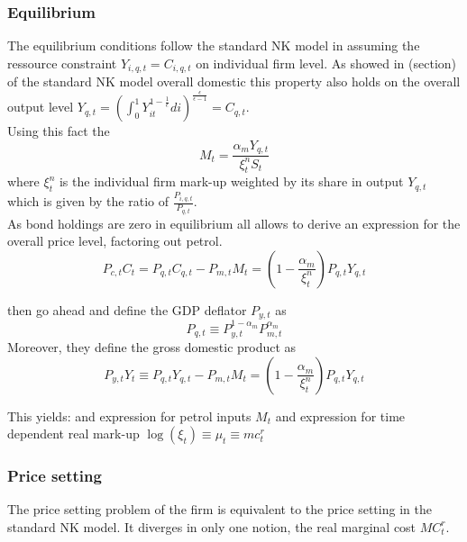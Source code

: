 \documentclass[12pt,a4paper,english]{article} %
\begin{document}
	\subsubsection{Equilibrium}
	The equilibrium conditions follow the standard NK model in assuming the ressource constraint $Y_{i,q,t} = C_{i,q,t}$ on individual firm level. As showed in (section) of the standard NK model overall domestic this property also holds on the overall output level $Y_{q,t} = \left( \int_{0}^{1} Y_{it}^{1-\frac{1}{\epsilon}} di \right)^{\frac{\epsilon}{\epsilon - 1}} = C_{q,t}$. \\
	
	Using this fact the 
	\begin{equation}
		M_t = \frac{\alpha_m Y_{q,t}}{\xi_{t}^n S_t}
	\end{equation}
	where $\xi_t^n$ is the individual firm mark-up weighted by its share in output $Y_{q,t}$ which is given by the ratio of $\frac{P_{i,q,t}}{P_{q,t}}$. \\
	
	As bond holdings are zero in equilibrium all  allows to derive an expression for the overall price level, factoring out petrol.
	\begin{equation}
		P_{c,t}C_t = P_{q,t} C_{q,t} - P_{m,t}M_t = \left(1 - \frac{\alpha_m}{\xi_t^n} \right) P_{q,t} Y_{q,t}
	\end{equation}

	\cite{blanchard_macroeconomic_2007} then go ahead and define the GDP deflator $P_{y,t}$ as
	\begin{equation}
		P_{q,t} \equiv P_{y,t}^{1-\alpha_m} P_{m,t}^{\alpha_m}
	\end{equation}
	Moreover, they define the gross domestic product as 
	\begin{equation}
		P_{y,t} Y_t \equiv P_{q,t} Y_{q,t} - P_{m,t} M_t = \left( 1 - \frac{\alpha_m}{\xi_t^n} \right) P_{q,t} Y_{q,t}
	\end{equation}
	
	This yields:
	and expression for petrol inputs $M_t$
	and expression for time dependent real mark-up $\log(\xi_t) \equiv \mu_t \equiv mc_t^r$
	
	
	\subsubsection{Price setting}
	The price setting problem of the firm is equivalent to the price setting in the standard NK model. It diverges in only one notion, the real marginal cost $MC_t^r$. \\
	
\end{document}
